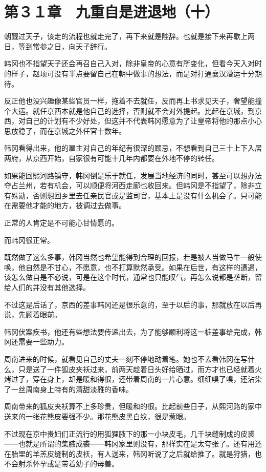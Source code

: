 \section{第３１章　九重自是进退地（十）}

朝觐过天子，该走的流程也就走完了，再下来就是陛辞。也就是接下来再歇上两日，等到常参之日，向天子辞行。

韩冈也不指望天子还会再召自己入对，除非皇帝的心意有所变化，但看今天入对时的样子，赵顼可没有半点要留自己在朝中做事的想法，而是对打通襄汉漕运十分期待。

反正他也没兴趣像某些官员一样，拖着不去就任，反而再上书求见天子，奢望能撞个大运。就任京西本就是他自己的选择，否则就不会对外提起。比起在京城，到京西，对自己的计划有不少好处，但这并不代表韩冈愿意为了让皇帝将他的那点小心思放稳了，而在京城之外任官十数年。

韩冈看得出来，他的雇主对自己的年纪有很深的顾忌，不想看到自己三十上下入居两府，从京西开始，自家很有可能十几年内都要在外地不停的转任。

如果能回熙河路镇守，韩冈倒是乐于就任，发展当地经济的同时，甚至可以想办法夺占兰州，若有机会，可以顺便将河西走廊也收回来。但韩冈是不指望了，除非立有殊勋，否则想回乡里去任亲民官或是监司官，基本上是没有什么机会了。只可能在需要他才能的地方，被调过去做事。

正常的人肯定是不可能心甘情愿的。

而韩冈很正常。

既然做了这么多事，韩冈当然也希望能得到合理的回报，若是被人当做马牛一般使唤，他自然是不甘心，不愿意，也不打算默然承受。如果在后世，有这样的遭遇，该怎么做自是不必说，可是在这个时代，通常也只能叹气，再怎么说都是垄断，留给人们的并没有其他选择。

不过这是后话了，京西的差事韩冈还是很乐意的，至于以后的事，那就放在以后再说，先顾着眼前。

韩冈伏案疾书，他还有些想法要传递出去，为了能够顺利将这一桩差事给完成，韩冈还需要一些助力。

周南进来的时候，就看见自己的丈夫一刻不停地动着笔。她也不去看韩冈在写什么，只是送了一件狐皮夹袄过来，前两天趁着日头好给晒过，而方才也已经就着火烤过了，穿在身上，却是暖和得很，还带着周南的一片心意。细细嗅了嗅，还沾染了一丝周南身上特有的清甜淡雅的香味。

周南带来的狐皮夹袄算不上多珍贵，但暖和的很。比起前些日子，从熙河路的家中送来的一张花熊皮要强不少。那花熊皮黑白纹，很是惹眼。

不过现在京中贵妇们正流行的用狐狸腋下的那一小块皮毛，几千块缝制成的皮裘——也就是所谓的集腋成裘——韩冈家里则没有，那样实在是太夸张了。还有用还在胎里的羊羔皮缝制的皮袄，有人送来，韩冈听说了之后就给推了。就是狩猎，也不会射杀怀孕或是带着幼子的母兽。

